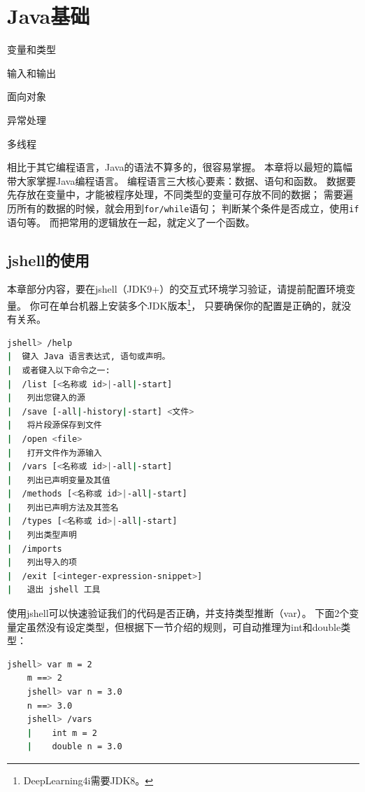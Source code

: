 \chapter{Java基础}

\begin{introduction}
	\item 变量和类型
	\item 输入和输出
	\item 面向对象
	\item 异常处理
	\item 多线程
\end{introduction}

相比于其它编程语言，Java的语法不算多的，很容易掌握。
本章将以最短的篇幅带大家掌握Java编程语言。
编程语言三大核心要素：数据、语句和函数。
数据要先存放在变量中，才能被程序处理，不同类型的变量可存放不同的数据；
需要遍历所有的数据的时候，就会用到\lstinline{for/while}语句；
判断某个条件是否成立，使用\lstinline{if}语句等。
而把常用的逻辑放在一起，就定义了一个函数。

\section{jshell的使用}
本章部分内容，要在jshell（JDK9+）的交互式环境学习验证，请提前配置环境变量。
你可在单台机器上安装多个JDK版本\footnote{DeepLearning4i需要JDK8。}，
只要确保你的配置是正确的，就没有关系。

\begin{lstlisting}[language=bash]
	jshell> /help
|  键入 Java 语言表达式, 语句或声明。
|  或者键入以下命令之一:
|  /list [<名称或 id>|-all|-start]
|  	列出您键入的源
|  /save [-all|-history|-start] <文件>
|  	将片段源保存到文件
|  /open <file>
|  	打开文件作为源输入
|  /vars [<名称或 id>|-all|-start]
|  	列出已声明变量及其值
|  /methods [<名称或 id>|-all|-start]
|  	列出已声明方法及其签名
|  /types [<名称或 id>|-all|-start]
|  	列出类型声明
|  /imports 
|  	列出导入的项
|  /exit [<integer-expression-snippet>]
|  	退出 jshell 工具
\end{lstlisting}

使用jshell可以快速验证我们的代码是否正确，并支持类型推断（var）。
下面2个变量定虽然没有设定类型，但根据下一节介绍的规则，可自动推理为int和double类型：
\begin{lstlisting}[language=bash, backgroundcolor=\color{lightgray!10}]
	jshell> var m = 2
	m ==> 2
	jshell> var n = 3.0
	n ==> 3.0
	jshell> /vars
	|    int m = 2
	|    double n = 3.0
\end{lstlisting}

